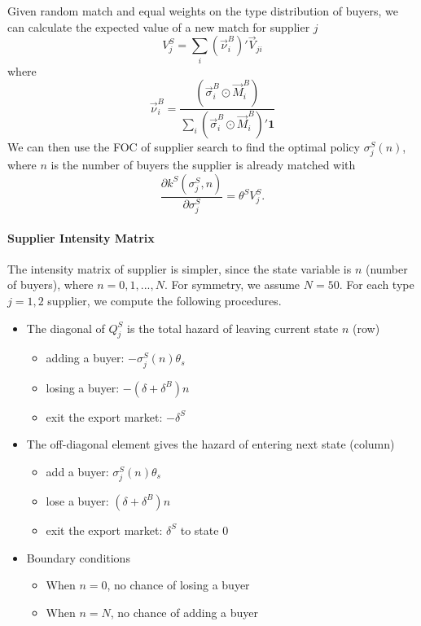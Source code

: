 \documentclass[12pt]{article} \usepackage{amsmath,amssymb,amsthm,geometry,graphicx,setspace,algorithm,algpseudocode,float}
\begin{document}
\begin{itemize}
\[\]
Given random match and equal weights on the type distribution of buyers, we can calculate the expected value of a new match for supplier $j$
\[
   V_j^S = \sum_{i}(\vec{\nu}_i^B)'\vec{V}_{ji}
\]
where
\[
  \vec{\nu}_i^B = \frac{(\vec{\sigma}_i^B\odot \vec{M}_i^B)}{\sum_i(\vec{\sigma}_i^B\odot \vec{M}_i^B)'\mathbf{1}}
\]
We can then use the FOC of supplier search to find the optimal policy $\sigma^S_j(n)$, where $n$ is the number of buyers the supplier is already matched with
\begin{equation*}
\frac{\partial k^{S}\left( \sigma_j^{S},n\right) }{\partial \sigma_j^{S}}=\theta^{S}V_{j}^{S}. 
\end{equation*}
\end{itemize}

\paragraph{Supplier Intensity Matrix} 
The intensity matrix of supplier is simpler, since the state variable is $n$ (number of buyers), where $n=0,1,...,N$. For symmetry, we assume $N = 50 $. For each type $j = 1,2$ supplier, we compute the following procedures.
\begin{itemize}
\item The diagonal of $Q_j^S$ is the total hazard of leaving current state $n$ (row)
\begin{itemize}
\item adding a buyer: $-\sigma^S_j(n)\theta_s$
\item losing a buyer: $-(\delta + \delta^B)n$
\item exit the export market: $-\delta^S$
\end{itemize}
\item The off-diagonal element gives the hazard of entering next state (column)
\begin{itemize}
\item add a buyer: $\sigma_j^S(n)\theta_s$  
\item lose a buyer: $(\delta + \delta^B)n$ 
\item exit the export market: $\delta^S$ to state $0$
\end{itemize}
\item Boundary conditions 
\begin{itemize}
\item When $n = 0$, no chance of losing a buyer
\item When $n = N$, no chance of adding a buyer
\end{itemize}
\end{itemize}
\end{document}
